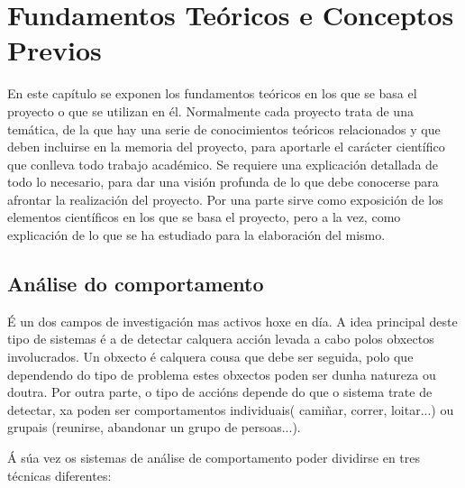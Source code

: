 \chapter{Fundamentos Teóricos e Conceptos Previos}

En este capítulo se exponen los fundamentos teóricos en los que se basa el proyecto o que se
utilizan en él.
Normalmente cada proyecto trata de una temática, de la que hay una serie de conocimientos
teóricos relacionados y que deben incluirse en la memoria del proyecto, para aportarle el carácter
científico que conlleva todo trabajo académico.
Se requiere una explicación detallada de todo lo necesario, para dar una visión profunda de lo
que debe conocerse para afrontar la realización del proyecto. Por una parte sirve como exposición
de los elementos científicos en los que se basa el proyecto, pero a la vez, como explicación de lo
que se ha estudiado para la elaboración del mismo.

\section{Análise do comportamento}
	
	É un dos campos de investigación mas activos hoxe en día. A idea principal 
	deste tipo de sistemas é a de detectar calquera acción levada a cabo polos 
	obxectos involucrados. Un obxecto é calquera cousa que debe ser seguida, polo
	que dependendo do tipo de problema estes obxectos poden ser dunha natureza ou doutra.
	Por outra parte, o tipo de accións depende do que o sistema trate de detectar, xa poden
	ser comportamentos individuais( camiñar, correr, loitar...) ou grupais (reunirse, 
	abandonar un grupo de persoas...).
	
	Á súa vez os sistemas de análise de comportamento poder dividirse en tres 
	técnicas diferentes\cite{brais-thesis}:
	
